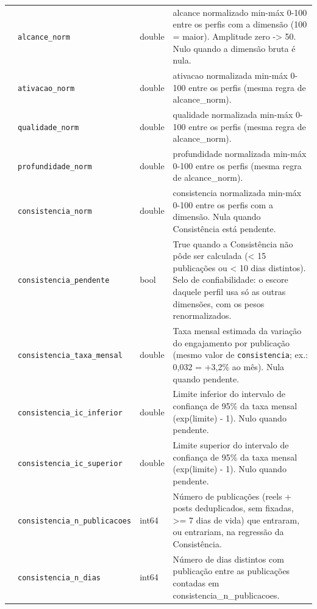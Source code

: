 \begin{footnotesize}
\begin{longtable}{p{3.2cm}p{3.0cm}p{2.0cm}p{6.0cm}}
\texttt{} & \texttt{alcance\_\allowbreak{}norm} & double & alcance normalizado min-máx 0-100 entre os perfis com a dimensão (100 = maior). Amplitude zero -> 50. Nulo quando a dimensão bruta é nula. \\
\texttt{} & \texttt{ativacao\_\allowbreak{}norm} & double & ativacao normalizada min-máx 0-100 entre os perfis (mesma regra de alcance\_\allowbreak{}norm). \\
\texttt{} & \texttt{qualidade\_\allowbreak{}norm} & double & qualidade normalizada min-máx 0-100 entre os perfis (mesma regra de alcance\_\allowbreak{}norm). \\
\texttt{} & \texttt{profundidade\_\allowbreak{}norm} & double & profundidade normalizada min-máx 0-100 entre os perfis (mesma regra de alcance\_\allowbreak{}norm). \\
\texttt{} & \texttt{consistencia\_\allowbreak{}norm} & double & consistencia normalizada min-máx 0-100 entre os perfis com a dimensão. Nula quando Consistência está pendente. \\
\texttt{} & \texttt{consistencia\_\allowbreak{}pendente} & bool & True quando a Consistência não pôde ser calculada (< 15 publicações ou < 10 dias distintos). Selo de confiabilidade: o escore daquele perfil usa só as outras dimensões, com os pesos renormalizados. \\
\texttt{} & \texttt{consistencia\_\allowbreak{}taxa\_\allowbreak{}mensal} & double & Taxa mensal estimada da variação do engajamento por publicação (mesmo valor de \texttt{consistencia}; ex.: 0,032 = +3,2\% ao mês). Nula quando pendente. \\
\texttt{} & \texttt{consistencia\_\allowbreak{}ic\_\allowbreak{}inferior} & double & Limite inferior do intervalo de confiança de 95\% da taxa mensal (exp(limite) - 1). Nulo quando pendente. \\
\texttt{} & \texttt{consistencia\_\allowbreak{}ic\_\allowbreak{}superior} & double & Limite superior do intervalo de confiança de 95\% da taxa mensal (exp(limite) - 1). Nulo quando pendente. \\
\texttt{} & \texttt{consistencia\_\allowbreak{}n\_\allowbreak{}publicacoes} & int64 & Número de publicações (reels + posts deduplicados, sem fixadas, >= 7 dias de vida) que entraram, ou entrariam, na regressão da Consistência. \\
\texttt{} & \texttt{consistencia\_\allowbreak{}n\_\allowbreak{}dias} & int64 & Número de dias distintos com publicação entre as publicações contadas em consistencia\_\allowbreak{}n\_\allowbreak{}publicacoes. \\

\end{longtable}
\end{footnotesize}
